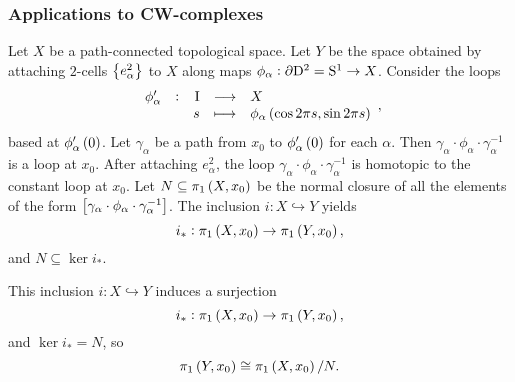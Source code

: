 \subsubsection{Applications to CW-complexes}

Let $ X $ be a path-connected topological space. Let $ Y $ be the space obtained by attaching $ 2 $-cells $ \cbr{e_\alpha^2} $ to $ X $ along maps $ \phi_\alpha : \partial \mathrm{D}^2 = \mathrm{S}^1 \to X $. Consider the loops
$$ \function[\phi_\alpha']{\I}{X}{s}{\phi_\alpha\br{\cos 2\pi s, \sin 2\pi s}}, $$
based at $ \phi_\alpha'\br{0} $. Let $ \gamma_\alpha $ be a path from $ x_0 $ to $ \phi_\alpha'\br{0} $ for each $ \alpha $. Then $ \gamma_\alpha \cdot \phi_\alpha \cdot \gamma_\alpha^{-1} $ is a loop at $ x_0 $. After attaching $ e_\alpha^2 $, the loop $ \gamma_\alpha \cdot \phi_\alpha \cdot \gamma_\alpha^{-1} $ is homotopic to the constant loop at $ x_0 $. Let $ N \subseteq \pi_1\br{X, x_0} $ be the normal closure of all the elements of the form $ \sbr{\gamma_\alpha \cdot \phi_\alpha \cdot \gamma_\alpha^{-1}} $. The inclusion $ i : X \hookrightarrow Y $ yields
$$ i_* : \pi_1\br{X, x_0} \to \pi_1\br{Y, x_0}, $$
and $ N \subseteq \ker i_* $.

\begin{proposition}
\label{prop:1.26}
This inclusion $ i : X \hookrightarrow Y $ induces a surjection
$$ i_* : \pi_1\br{X, x_0} \to \pi_1\br{Y, x_0}, $$
and $ \ker i_* = N $, so
$$ \pi_1\br{Y, x_0} \cong \pi_1\br{X, x_0} / N. $$
\end{proposition}


